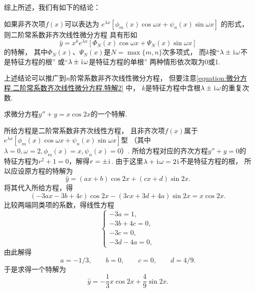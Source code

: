 综上所述，我们有如下的结论：

如果非齐次项\(f(x)\)可以表达为
\(e^{\lambda x} [\phi_m(x) \cos\omega x + \psi_n(x) \sin\omega x]\)
的形式，
则二阶常系数非齐次线性微分方程
具有形如
\begin{equation}\label{equation:微分方程.二阶常系数齐次线性微分方程.特解2}
\hat{y} = x^k e^{\lambda x} [\Phi_N(x) \cos\omega x + \Psi_N(x) \sin\omega x]
\end{equation}
的特解，
其中\(\Phi_N(x)\)、\(\Psi_N(x)\)是\(N=\max\{m,n\}\)次多项式，
而\(k\)按“\(\lambda\pm\kern1pt\mathrm{i}\kern1pt\omega\)不是特征方程的根”%
或“\(\lambda\pm\kern1pt\mathrm{i}\kern1pt\omega\)是特征方程的单根”%
两种情形依次取为0或1.

上述结论可以推广到\(n\)阶常系数非齐次线性微分方程，
但要注意\cref{equation:微分方程.二阶常系数齐次线性微分方程.特解2} 中，
\(k\)是特征方程中含根\(\lambda\pm\kern1pt\mathrm{i}\kern1pt\omega\)的重复次数.

\begin{example}
求微分方程\(y''+y=x \cos2x\)的一个特解.
\begin{solution}
所给方程是二阶常系数非齐次线性方程，
且非齐次项\(f(x)\)属于\(e^{\lambda x} [\phi_m(x) \cos\omega x + \psi_n(x) \sin\omega x]\)型
（其中\(\lambda=0,
\omega=2,
\phi_m(x) = x,
\psi_n(x) = 0\)）.
所给方程对应的齐次方程\(y''+y=0\)的特征方程为\(r^2+1=0\)，解得\(r=\pm\kern1pt\mathrm{i}\kern1pt\).
由于这里\(\lambda+\kern1pt\mathrm{i}\kern1pt\omega=2\kern1pt\mathrm{i}\kern1pt\)不是特征方程的根，
所以应设原方程的特解为\[
\hat{y} = (ax+b) \cos2x + (cx+d) \sin2x.
\]
将其代入所给方程，得\[
(-3ax-3b+4c) \cos2x - (3cx+3d+4a) \sin2x = x \cos2x.
\]
比较两端同类项的系数，得线性方程\[
\left\{ \begin{array}{l}
	-3a=1, \\
	-3b+4c=0, \\
	-3c=0, \\
	-3d-4a=0,
\end{array} \right.
\]由此解得\[
a = -1/3, \qquad
b = 0, \qquad
c = 0, \qquad
d = 4/9.
\]
于是求得一个特解为\[
\hat{y} = -\frac{1}{3} x\cos2x + \frac{4}{9} \sin2x.
\]
\end{solution}
\end{example}

